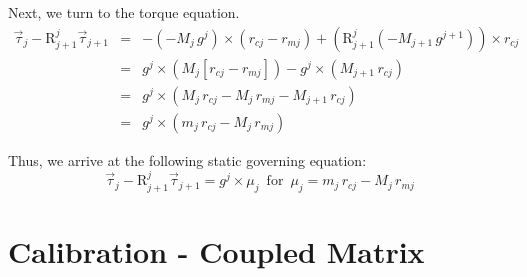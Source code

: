 \documentclass[letterpaper,12pt]{article}
\newcommand{\R}[2]{{\mbox{R}}^{#1}_{#2}}
\begin{document}
      Next, we turn to the torque equation.
      \begin{eqnarray}
         \vec\tau_j - \R{j}{j+1} \vec\tau_{j+1}
            &=& - \left( - M_j \, g^j \right)
               \times \left( r_{cj} - r_{mj} \right)
            + \left( \R{j}{j+1}
               \left( - M_{j+1} \, g^{j+1} \right)
            \right) \times r_{cj} \\
            &=& g^j
               \times \left( M_j \left[ r_{cj} - r_{mj} \right] \right)
            - g^j \times \left( M_{j+1} \, r_{cj} \right) \\
            &=& g^j \times
               \left(
                  M_j \, r_{cj} - M_j \, r_{mj}
                  - M_{j+1} \, r_{cj}
               \right) \\
            &=& g^j \times
               \left(
                  m_j \, r_{cj} - M_j \, r_{mj}
               \right) 
      \end{eqnarray}
      
      \noindent
      Thus, we arrive at the following static governing equation:
      \begin{equation}
         \vec\tau_j - \R{j}{j+1} \vec\tau_{j+1} = g^j \times \mu_j
            \,\,\,\mbox{for}\,\,\,
            \mu_j = m_j \, r_{cj} - M_j \, r_{mj}
      \end{equation}
      
      \newpage

\section{Calibration - Coupled Matrix}
\end{document}
